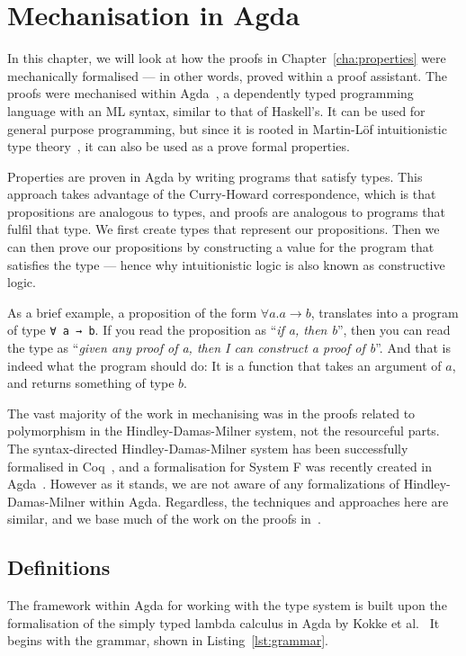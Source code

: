 \chapter{Mechanisation in Agda}\label{cha:mechanisation}
In this chapter, we will look at how the proofs in
Chapter~\ref{cha:properties} were mechanically formalised --- in other
words, proved within a proof assistant.  The proofs were mechanised
within Agda~\cite{norell2009}, a dependently typed programming
language with an ML syntax, similar to that of Haskell's. It can be
used for general purpose programming, but since it is rooted in
Martin-Löf intuitionistic type theory~\cite{martin-lof1984}, it can
also be used as a prove formal properties.

Properties are proven in Agda by writing programs that satisfy
types. This approach takes advantage of the Curry-Howard
correspondence, which is that propositions are analogous to types, and
proofs are analogous to programs that fulfil that type. We first
create types that represent our propositions. Then we can then prove
our propositions by constructing a value for the program that
satisfies the type --- hence why intuitionistic logic is also known as
constructive logic.

As a brief example, a proposition of the form
$\forall a. a \rightarrow b$, translates into a program of type \texttt{∀ a → b}. If you read the proposition as ``\textit{if a, then b}'', then
you can read the type as ``\textit{given any proof of a, then I can
  construct a proof of b}''. And that is indeed what the program
should do: It is a function that takes an argument of $a$, and returns
something of type $b$.

The vast majority of the work in mechanising was in the proofs related
to polymorphism in the Hindley-Damas-Milner system, not the
resourceful parts. The syntax-directed Hindley-Damas-Milner system has
been successfully formalised in Coq~\cite{dubois2000}, and a
formalisation for System F was recently created in
Agda~\cite{chapman2019}. However as it stands, we are not aware of any
formalizations of Hindley-Damas-Milner within Agda. Regardless, the
techniques and approaches here are similar, and we base much of the
work on the proofs in~\cite{wright1994}.

\section{Definitions}
The framework within Agda for working with the type system is built
upon the formalisation of the simply typed lambda calculus in Agda by
Kokke et al.~\cite{kokke2020} It begins with the grammar, shown in
Listing~\ref{lst:grammar}.

